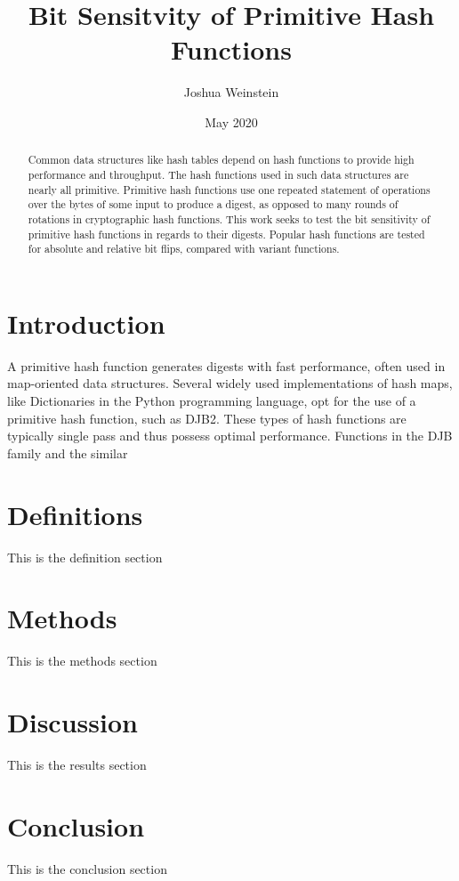 \documentclass{article}
\title{Bit Sensitvity of Primitive Hash Functions}
\author{Joshua Weinstein}
\affil{Splunk Inc}
\date{May 2020}
\begin{document}
\maketitle

\begin{abstract}
Common data structures like hash tables depend on hash functions to provide high performance and throughput. The hash functions used in such data structures are nearly all primitive. Primitive hash functions use one repeated statement of operations over the bytes of some input to produce a digest, as opposed to many rounds of rotations in cryptographic hash functions. This work seeks to test the bit sensitivity of primitive hash functions in regards to their digests. Popular hash functions are tested for absolute and relative bit flips, compared with variant functions. 
\end{abstract}

\section{Introduction}
A primitive hash function generates digests with fast performance, often used in map-oriented data structures. Several widely used implementations of hash maps, like Dictionaries\citep{PythonDJB2} in the Python programming language, opt for the use of a primitive hash function, such as DJB2. These types of hash functions are typically single pass and thus possess optimal performance. Functions in the DJB family and the similar 


\section{Definitions}

This is the definition section

\section{Methods}

This is the methods section

\section{Discussion}

This is the results section



\section{Conclusion}
This is the conclusion section



\end{document}
